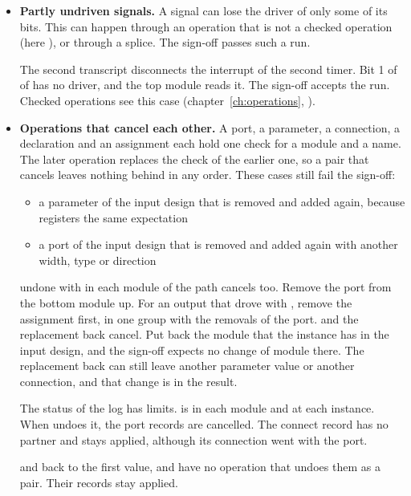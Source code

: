 \begin{itemize}
  A declaration that  writes has no structural expectation.
\item \textbf{Partly undriven signals.} A signal can lose the driver of only some of
  its bits. This can happen through an operation that is not a checked operation (here
  ), or through a splice. The sign-off passes such a run.

  The second transcript disconnects the interrupt of the second timer. Bit 1 of
   of  has no driver, and the top module reads it. The
  sign-off accepts the run. Checked operations see this case (chapter~\ref{ch:operations},
  ).
\item \textbf{Operations that cancel each other.} A port, a parameter, a connection, a
  declaration and an assignment each hold one check for a module and a name. The later
  operation replaces the check of the earlier one, so a pair that cancels leaves nothing
  behind in any order. These cases still fail the sign-off:
  \begin{itemize}
  \item a parameter of the input design that is removed and added again, because
     registers the same expectation
  \item a port of the input design that is removed and added again with another width,
    type or direction
  \end{itemize}
   undone with  in each module of the
  path cancels too. Remove the port from the bottom module up. For an output that
   drove with , remove the assignment first, in one group
  with the removals of the port.
   and the replacement back cancel. Put back the module
  that the instance has in the input design, and the sign-off expects no change of module
  there. The replacement back can still leave another
  parameter value or another connection, and that change is in the result.

  The status  of the log has limits.  is
   in each module and  at each instance.
  When  undoes it, the port records are cancelled. The connect
  record has no partner and stays applied, although its connection went with the port.

   and  back to the first value,
   and  have no operation
  that undoes them as a pair. Their records stay applied.


\end{itemize}
